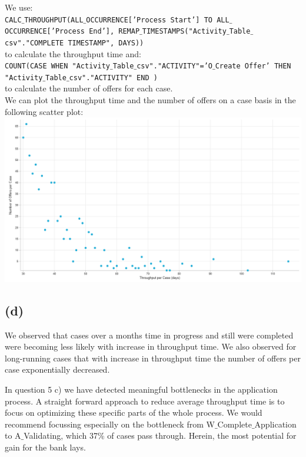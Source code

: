 \documentclass[../../main.tex]{subfiles}
\begin{document}
We use: \\
	\texttt{CALC$\_$THROUGHPUT(ALL$\_$OCCURRENCE['Process Start'] TO ALL$\_$OCCURRENCE['Process End'], REMAP$\_$TIMESTAMPS("Activity$\_$Table$\_$csv"."COMPLETE TIMESTAMP", DAYS))}\\
to calculate the throughput time and:\\
	\texttt{COUNT(CASE WHEN "Activity$\_$Table$\_$csv"."ACTIVITY"='O$\_$Create Offer' THEN \\ "Activity$\_$Table$\_$csv"."ACTIVITY" END )}\\
to calculate the number of offers for each case.\\
We can plot the throughput time and the number of offers on a case basis in the following scatter plot:\\
\includegraphics[width=\textwidth]{img/QUESTION_5c_scatter.png}


\subsection*{(d)}
We observed that cases over a months time in progress and still were completed were becoming less likely with increase in throughput time. We also observed for long-running cases that with increase in throughput time the number of offers per case exponentially decreased.

In question 5 c) we have detected meaningful bottlenecks in the application process. A straight forward approach to reduce average throughput time is to focus on optimizing these specific parts of the whole process. We would recommend focussing especially on the bottleneck from W$\_$Complete$\_$Application to A$\_$Validating, which 37\% of cases pass through. Herein, the most potential for gain for the bank lays.
\end{document}
